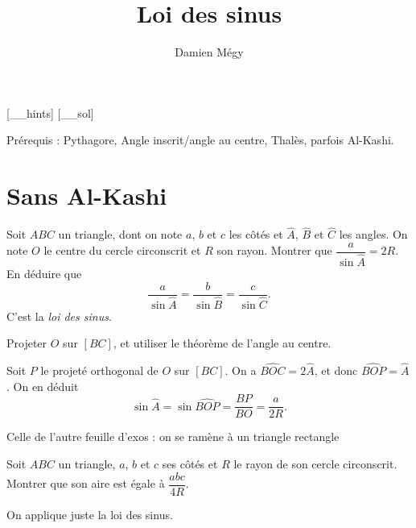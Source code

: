 





[_\jobname_hints]
[_\jobname_sol]


\title{Loi des sinus}
\author{Damien Mégy}
\maketitle

Prérequis : Pythagore, Angle inscrit/angle au centre, Thalès, parfois Al-Kashi.

\section{Sans Al-Kashi}

\begin{exo}
Soit $ABC$ un triangle, dont on note $a$, $b$ et $c$ les côtés et $\widehat A$, $\widehat B$ et $\widehat C$ les angles.
On note $O$ le centre du cercle  circonscrit et $R$ son rayon.
Montrer que $\dfrac{a}{\sin \widehat A} = 2R$.
En déduire que
\[ \frac{a}{\sin \widehat A} = \frac{b}{\sin \widehat B}  = \frac{c}{\sin \widehat C}.\]
C'est la \emph{loi des sinus}.
\begin{hint}
Projeter $O$ sur $[BC]$, et utiliser le théorème de l'angle au centre.
\end{hint}
\begin{sol}
Soit $P$ le projeté orthogonal de $O$ sur $[BC]$.
On a $\widehat{BOC} = 2\widehat{A}$, et donc $\widehat{BOP}=\widehat A$.
On en déduit 
\[ \sin \widehat A = \sin \widehat{BOP}
= \frac{BP}{BO} = \frac{a}{2R}.\]
\end{sol}
\end{exo}


\begin{exo}
Celle de l'autre feuille d'exos : on se ramène à un triangle rectangle
\begin{hint}
\end{hint}
\begin{sol}
\end{sol}
\end{exo}

\begin{exo}
Soit $ABC$ un triangle, $a$, $b$ et $c$ ses côtés et $R$ le rayon de son cercle circonscrit.
Montrer que son aire est égale à $\dfrac{abc}{4R}$.
\begin{hint}
\end{hint}
\begin{sol}
On applique juste la loi des sinus.
\end{sol}
\end{exo}

